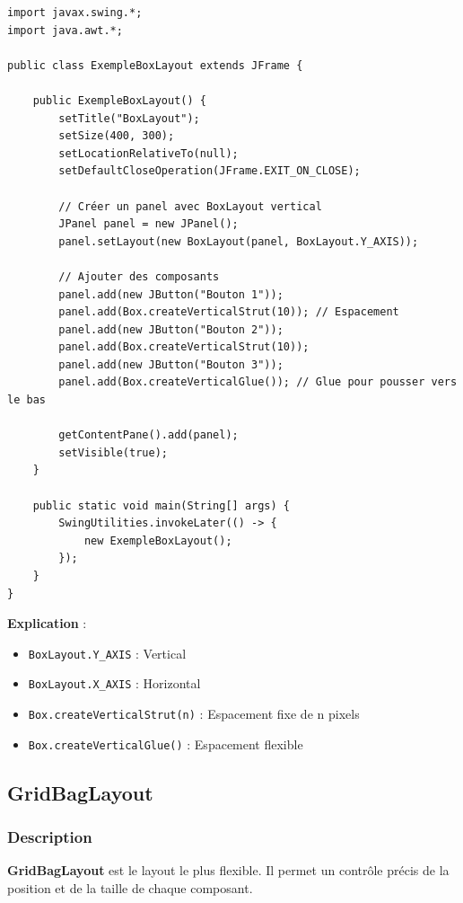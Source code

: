 \documentclass[11pt,a4paper]{article}
\begin{document}
\begin{lstlisting}
import javax.swing.*;
import java.awt.*;

public class ExempleBoxLayout extends JFrame {
    
    public ExempleBoxLayout() {
        setTitle("BoxLayout");
        setSize(400, 300);
        setLocationRelativeTo(null);
        setDefaultCloseOperation(JFrame.EXIT_ON_CLOSE);
        
        // Créer un panel avec BoxLayout vertical
        JPanel panel = new JPanel();
        panel.setLayout(new BoxLayout(panel, BoxLayout.Y_AXIS));
        
        // Ajouter des composants
        panel.add(new JButton("Bouton 1"));
        panel.add(Box.createVerticalStrut(10)); // Espacement
        panel.add(new JButton("Bouton 2"));
        panel.add(Box.createVerticalStrut(10));
        panel.add(new JButton("Bouton 3"));
        panel.add(Box.createVerticalGlue()); // Glue pour pousser vers le bas
        
        getContentPane().add(panel);
        setVisible(true);
    }
    
    public static void main(String[] args) {
        SwingUtilities.invokeLater(() -> {
            new ExempleBoxLayout();
        });
    }
}
\end{lstlisting}

\textbf{Explication} :
\begin{itemize}
    \item \texttt{BoxLayout.Y\_AXIS} : Vertical
    \item \texttt{BoxLayout.X\_AXIS} : Horizontal
    \item \texttt{Box.createVerticalStrut(n)} : Espacement fixe de n pixels
    \item \texttt{Box.createVerticalGlue()} : Espacement flexible
\end{itemize}

\subsection{GridBagLayout}

\subsubsection{Description}

\textbf{GridBagLayout} est le layout le plus flexible. Il permet un contrôle précis de la position et de la taille de chaque composant.
\end{document}
